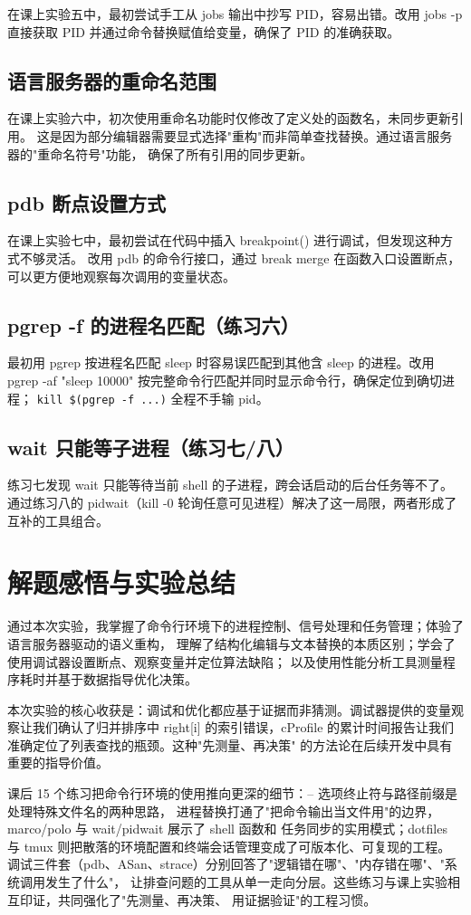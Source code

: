 \documentclass[UTF8]{ctexart}
\begin{document}
在课上实验五中，最初尝试手工从 jobs 输出中抄写 PID，容易出错。改用 jobs -p 直接获取 PID
并通过命令替换赋值给变量，确保了 PID 的准确获取。

\subsection{语言服务器的重命名范围}

在课上实验六中，初次使用重命名功能时仅修改了定义处的函数名，未同步更新引用。
这是因为部分编辑器需要显式选择"重构"而非简单查找替换。通过语言服务器的"重命名符号"功能，
确保了所有引用的同步更新。

\subsection{pdb 断点设置方式}

在课上实验七中，最初尝试在代码中插入 breakpoint() 进行调试，但发现这种方式不够灵活。
改用 pdb 的命令行接口，通过 break merge 在函数入口设置断点，可以更方便地观察每次调用的变量状态。

\subsection{pgrep -f 的进程名匹配（练习六）}

最初用 pgrep 按进程名匹配 sleep 时容易误匹配到其他含 sleep 的进程。改用
pgrep -af "sleep 10000" 按完整命令行匹配并同时显示命令行，确保定位到确切进程；
\texttt{kill \$(pgrep -f ...)} 全程不手输 pid。

\subsection{wait 只能等子进程（练习七/八）}

练习七发现 wait 只能等待当前 shell 的子进程，跨会话启动的后台任务等不了。
通过练习八的 pidwait（kill -0 轮询任意可见进程）解决了这一局限，两者形成了互补的工具组合。

\section{解题感悟与实验总结}

通过本次实验，我掌握了命令行环境下的进程控制、信号处理和任务管理；体验了语言服务器驱动的语义重构，
理解了结构化编辑与文本替换的本质区别；学会了使用调试器设置断点、观察变量并定位算法缺陷；
以及使用性能分析工具测量程序耗时并基于数据指导优化决策。

本次实验的核心收获是：调试和优化都应基于证据而非猜测。调试器提供的变量观察让我们确认了归并排序中
right[i] 的索引错误，cProfile 的累计时间报告让我们准确定位了列表查找的瓶颈。这种"先测量、再决策"
的方法论在后续开发中具有重要的指导价值。

课后 15 个练习把命令行环境的使用推向更深的细节：-- 选项终止符与路径前缀是处理特殊文件名的两种思路，
进程替换打通了"把命令输出当文件用"的边界，marco/polo 与 wait/pidwait 展示了 shell 函数和
任务同步的实用模式；dotfiles 与 tmux 则把散落的环境配置和终端会话管理变成了可版本化、可复现的工程。
调试三件套（pdb、ASan、strace）分别回答了"逻辑错在哪"、"内存错在哪"、"系统调用发生了什么"，
让排查问题的工具从单一走向分层。这些练习与课上实验相互印证，共同强化了"先测量、再决策、
用证据验证"的工程习惯。
\end{document}
